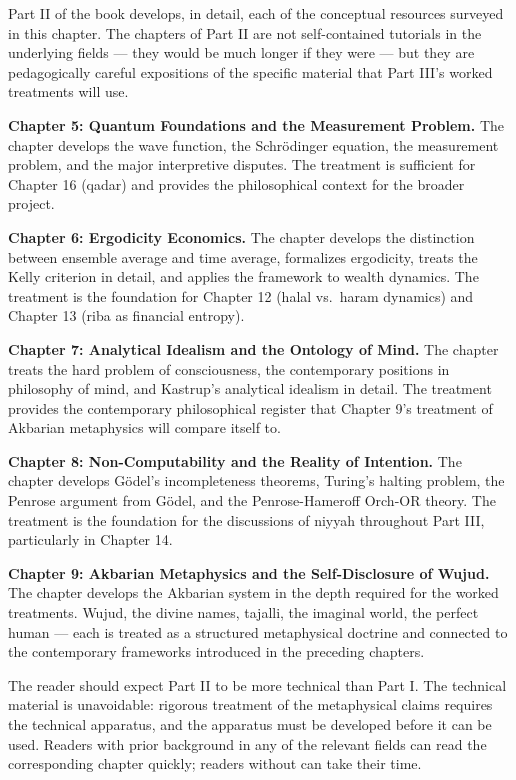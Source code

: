 Part II of the book develops, in detail, each of the conceptual
resources surveyed in this chapter. The chapters of Part II are not
self-contained tutorials in the underlying fields --- they would be
much longer if they were --- but they are pedagogically careful
expositions of the specific material that Part III's worked
treatments will use.

\textbf{Chapter 5: Quantum Foundations and the Measurement Problem.}
The chapter develops the wave function, the Schr\"odinger equation,
the measurement problem, and the major interpretive disputes. The
treatment is sufficient for Chapter 16 (qadar) and provides the
philosophical context for the broader project.

\textbf{Chapter 6: Ergodicity Economics.} The chapter develops the
distinction between ensemble average and time average, formalizes
ergodicity, treats the Kelly criterion in detail, and applies the
framework to wealth dynamics. The treatment is the foundation for
Chapter 12 (halal vs.\ haram dynamics) and Chapter 13 (riba as
financial entropy).

\textbf{Chapter 7: Analytical Idealism and the Ontology of Mind.}
The chapter treats the hard problem of consciousness, the
contemporary positions in philosophy of mind, and Kastrup's
analytical idealism in detail. The treatment provides the
contemporary philosophical register that Chapter 9's treatment of
Akbarian metaphysics will compare itself to.

\textbf{Chapter 8: Non-Computability and the Reality of Intention.}
The chapter develops G\"odel's incompleteness theorems, Turing's
halting problem, the Penrose argument from G\"odel, and the
Penrose-Hameroff Orch-OR theory. The treatment is the foundation
for the discussions of niyyah throughout Part III, particularly in
Chapter 14.

\textbf{Chapter 9: Akbarian Metaphysics and the Self-Disclosure of
Wujud.} The chapter develops the Akbarian system in the depth required
for the worked treatments. Wujud, the divine names, tajalli, the
imaginal world, the perfect human --- each is treated as a structured
metaphysical doctrine and connected to the contemporary frameworks
introduced in the preceding chapters.

The reader should expect Part II to be more technical than Part I.
The technical material is unavoidable: rigorous treatment of the
metaphysical claims requires the technical apparatus, and the
apparatus must be developed before it can be used. Readers with
prior background in any of the relevant fields can read the
corresponding chapter quickly; readers without can take their time.

